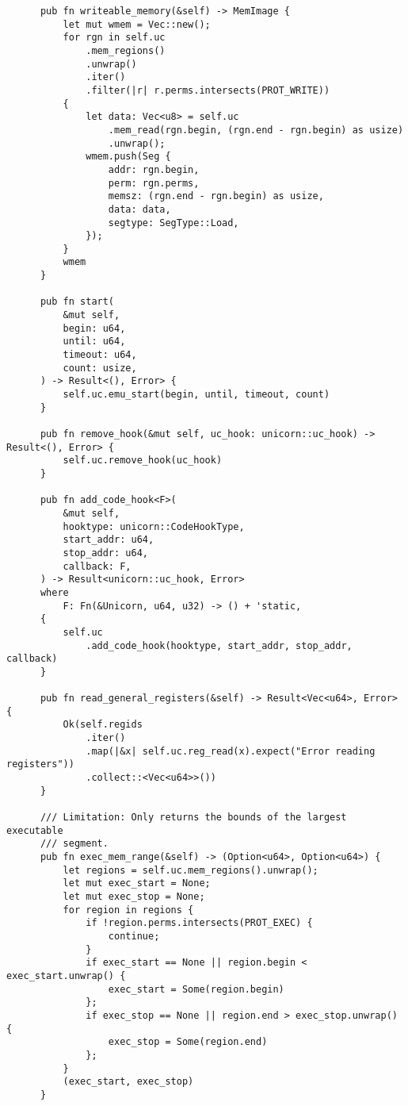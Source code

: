 \documentclass[11pt]{article}
\begin{document}
\begin{lstlisting}
      pub fn writeable_memory(&self) -> MemImage {
          let mut wmem = Vec::new();
          for rgn in self.uc
              .mem_regions()
              .unwrap()
              .iter()
              .filter(|r| r.perms.intersects(PROT_WRITE))
          {
              let data: Vec<u8> = self.uc
                  .mem_read(rgn.begin, (rgn.end - rgn.begin) as usize)
                  .unwrap();
              wmem.push(Seg {
                  addr: rgn.begin,
                  perm: rgn.perms,
                  memsz: (rgn.end - rgn.begin) as usize,
                  data: data,
                  segtype: SegType::Load,
              });
          }
          wmem
      }

      pub fn start(
          &mut self,
          begin: u64,
          until: u64,
          timeout: u64,
          count: usize,
      ) -> Result<(), Error> {
          self.uc.emu_start(begin, until, timeout, count)
      }

      pub fn remove_hook(&mut self, uc_hook: unicorn::uc_hook) -> Result<(), Error> {
          self.uc.remove_hook(uc_hook)
      }

      pub fn add_code_hook<F>(
          &mut self,
          hooktype: unicorn::CodeHookType,
          start_addr: u64,
          stop_addr: u64,
          callback: F,
      ) -> Result<unicorn::uc_hook, Error>
      where
          F: Fn(&Unicorn, u64, u32) -> () + 'static,
      {
          self.uc
              .add_code_hook(hooktype, start_addr, stop_addr, callback)
      }

      pub fn read_general_registers(&self) -> Result<Vec<u64>, Error> {
          Ok(self.regids
              .iter()
              .map(|&x| self.uc.reg_read(x).expect("Error reading registers"))
              .collect::<Vec<u64>>())
      }

      /// Limitation: Only returns the bounds of the largest executable
      /// segment.
      pub fn exec_mem_range(&self) -> (Option<u64>, Option<u64>) {
          let regions = self.uc.mem_regions().unwrap();
          let mut exec_start = None;
          let mut exec_stop = None;
          for region in regions {
              if !region.perms.intersects(PROT_EXEC) {
                  continue;
              }
              if exec_start == None || region.begin < exec_start.unwrap() {
                  exec_start = Some(region.begin)
              };
              if exec_stop == None || region.end > exec_stop.unwrap() {
                  exec_stop = Some(region.end)
              };
          }
          (exec_start, exec_stop)
      }


\end{lstlisting}
\end{document}
